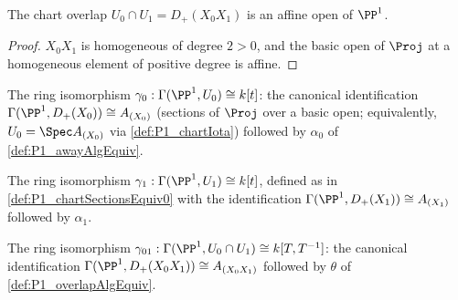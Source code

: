 \begin{lemma}
  \label{lem:P1_overlap_affine}
  \leanok
  The chart overlap \(U_0 \cap U_1 = D_+(X_0 X_1)\) is an affine open of \(\PP^1\).
\end{lemma}
\begin{proof}
  \leanok
  \(X_0 X_1\) is homogeneous of degree \(2 > 0\), and the basic open of \(\Proj\) at a
  homogeneous element of positive degree is affine.
\end{proof}

\begin{definition}
  \label{def:P1_chartSectionsEquiv0}
  \leanok
  The ring isomorphism \(\gamma_0 : \Gamma(\PP^1, U_0) \cong k[t]\): the canonical
  identification \(\Gamma(\PP^1, D_+(X_0)) \cong A_{(X_0)}\) (sections of \(\Proj\) over a
  basic open; equivalently, \(U_0 = \Spec A_{(X_0)}\) via \ref{def:P1_chartIota}) followed by
  \(\alpha_0\) of \ref{def:P1_awayAlgEquiv}.
\end{definition}

\begin{definition}
  \label{def:P1_chartSectionsEquiv1}
  \leanok
  The ring isomorphism \(\gamma_1 : \Gamma(\PP^1, U_1) \cong k[t]\), defined as in
  \ref{def:P1_chartSectionsEquiv0} with the identification
  \(\Gamma(\PP^1, D_+(X_1)) \cong A_{(X_1)}\) followed by \(\alpha_1\).
\end{definition}

\begin{definition}
  \label{def:P1_overlapSectionsEquiv}
  \leanok
  The ring isomorphism \(\gamma_{01} : \Gamma(\PP^1, U_0 \cap U_1) \cong k[T, T^{-1}]\): the
  canonical identification \(\Gamma(\PP^1, D_+(X_0X_1)) \cong A_{(X_0X_1)}\) followed by
  \(\theta\) of \ref{def:P1_overlapAlgEquiv}.
\end{definition}

